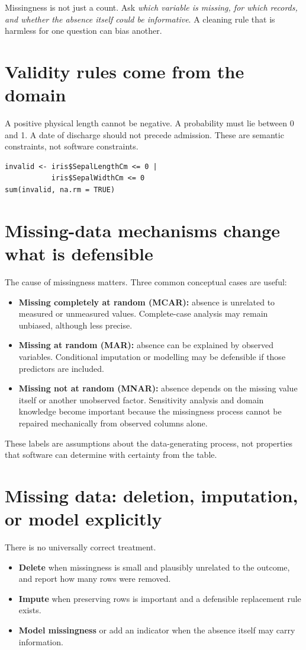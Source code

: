 Missingness is not just a count. Ask \emph{which variable is missing, for which records, and whether the absence itself could be informative}. A cleaning rule that is harmless for one question can bias another.

\section{Validity rules come from the domain}
A positive physical length cannot be negative. A probability must lie between 0 and 1. A date of discharge should not precede admission. These are semantic constraints, not software constraints.

\begin{lstlisting}[style=dsr]
invalid <- iris$SepalLengthCm <= 0 |
           iris$SepalWidthCm <= 0
sum(invalid, na.rm = TRUE)
\end{lstlisting}


\section{Missing-data mechanisms change what is defensible}
The cause of missingness matters. Three common conceptual cases are useful:
\begin{itemize}
  \item \textbf{Missing completely at random (MCAR):} absence is unrelated to measured or unmeasured values. Complete-case analysis may remain unbiased, although less precise.
  \item \textbf{Missing at random (MAR):} absence can be explained by observed variables. Conditional imputation or modelling may be defensible if those predictors are included.
  \item \textbf{Missing not at random (MNAR):} absence depends on the missing value itself or another unobserved factor. Sensitivity analysis and domain knowledge become important because the missingness process cannot be repaired mechanically from observed columns alone.
\end{itemize}
These labels are assumptions about the data-generating process, not properties that software can determine with certainty from the table.


\section{Missing data: deletion, imputation, or model explicitly}
There is no universally correct treatment.
\begin{itemize}
  \item \textbf{Delete} when missingness is small and plausibly unrelated to the outcome, and report how many rows were removed.
  \item \textbf{Impute} when preserving rows is important and a defensible replacement rule exists.
  \item \textbf{Model missingness} or add an indicator when the absence itself may carry information.
\end{itemize}

